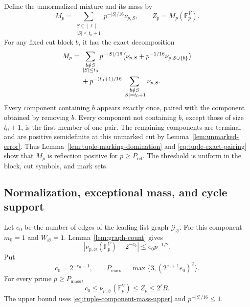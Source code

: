 Define the unnormalized mixture and its mass by
\begin{equation}
 M_p=\sum_{\substack{S\subseteq[\ell]\\|S|\le t_0+1}}
 p^{-|S|/16}\nu_{p,S},
 \qquad Z_p=M_p(\mathbb F_p^V).
 \label{eq:tuple-mixture}
\end{equation}
For any fixed cut block \(b\), it has the exact decomposition
\begin{align}
 M_p={}&\sum_{\substack{b\notin S\\|S|\le t_0}}
 p^{-|S|/16}
 \bigl(\nu_{p,S}+p^{-1/16}\nu_{p,S\cup\{b\}}\bigr)\notag\\
 &+p^{-(t_0+1)/16}
 \sum_{\substack{b\notin S\\|S|=t_0+1}}\nu_{p,S}.
 \label{eq:tuple-exact-pairing}
\end{align}
Every component containing \(b\) appears exactly once, paired with
the component obtained by removing \(b\).  Every component not
containing \(b\), except those of size \(t_0+1\), is the first
member of one pair.  The remaining components are terminal and
are positive semidefinite at this unmarked cut by
Lemma~\ref{lem:unmarked-error}.  Thus
Lemma~\ref{lem:tuple-marking-domination} and
\eqref{eq:tuple-exact-pairing} show that \(M_p\) is reflection
positive for \(p\ge P_{\mathrm{ref}}\).  The threshold is uniform
in the block, cut symbols, and mark sets.

\subsection{Normalization, exceptional mass, and cycle support}

Let \(e_0\) be the number of edges of the leading list graph
\(\mathcal G_{\varnothing}\).  For this component \(m_0=1\)
and \(W_{\varnothing}=1\).  Lemma~\ref{lem:graph-count} gives
\[
 \left|\nu_{p,\varnothing}(\mathbb F_p^V)-2^{-e_0}\right|
 \le e_0p^{-1/2}.
\]
Put
\begin{equation}
 c_0=2^{-e_0-1},\qquad
 P_{\mathrm{mass}}=\max\{3,(2^{e_0+1}e_0)^2\}.
 \label{eq:tuple-mass-constants}
\end{equation}
For every prime \(p\ge P_{\mathrm{mass}}\),
\begin{equation}
 c_0\le\nu_{p,\varnothing}(\mathbb F_p^V)
 \le Z_p\le 2^\ell B.
 \label{eq:tuple-normalizer-bounds}
\end{equation}
The upper bound uses \eqref{eq:tuple-component-mass-upper} and
\(p^{-|S|/16}\le1\).

